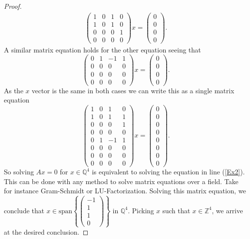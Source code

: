 \documentclass{article}
\newcommand{\Z}[0]{\mathbb{Z}}		%
\newcommand{\Q}[0]{\mathbb{Q}}		%
\theoremstyle{definition}
\theoremstyle{remark}
\begin{document}
\begin{proof}
\begin{align}
    \begin{pmatrix}1&0&1&0\\1&0&1&0\\0&0&0&1\\0&0&0&0\end{pmatrix} x =\begin{pmatrix}0\\0\\0\\0\end{pmatrix} . 
\end{align} A similar matrix equation holds for the other equation seeing that \begin{equation}\begin{pmatrix}0&1&-1&1\\0&0&0&0\\0&0&0&0\\0&0&0&0\end{pmatrix} x =\begin{pmatrix}0\\0\\0\\0\end{pmatrix}. \end{equation} As the $x$ vector is the same in both cases we can write this as a single matrix equation \begin{equation}\label{Ex2}
    \begin{pmatrix}1&0&1&0\\1&0&1&1\\0&0&0&1\\0&0&0&0\\0&1&-1&1\\0&0&0&0\\0&0&0&0\\0&0&0&0\end{pmatrix} x=\begin{pmatrix}0\\0\\0\\0\\0\\0\\0\\0\end{pmatrix}. 
\end{equation} 
So solving $Ax=0$ for $x\in \Q^4$ is equivalent to solving the equation in line (\ref{Ex2}). This can be done with any method to solve matrix equations over a field. Take for instance Gram-Schmidt or LU-Factorization. Solving this matrix equation, we conclude that $x\in \text{span}\left\{\begin{pmatrix} -1\\ 1\\ 1\\ 0\end{pmatrix}\right\} $ in $\Q^4$. Picking $x$ such that $x\in \Z^4$, we arrive at the desired conclusion. 
\end{proof}
\end{document}
